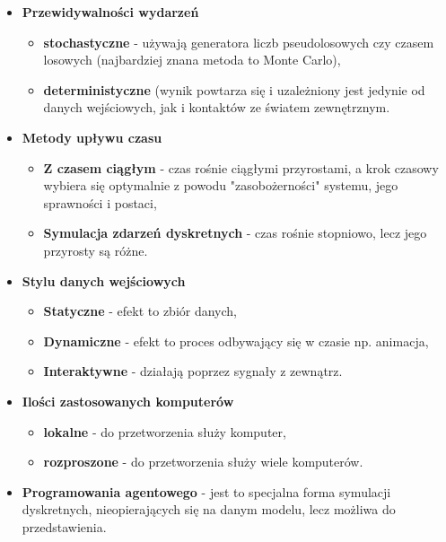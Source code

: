 \begin{itemize}
	\item \textbf{Przewidywalności wydarzeń}
	\begin{itemize}
		\item \textbf{stochastyczne} - używają generatora liczb pseudolosowych czy czasem losowych (najbardziej znana metoda to Monte Carlo),
		\item \textbf{deterministyczne} (wynik powtarza się i uzależniony jest jedynie od danych wejściowych, jak i kontaktów ze światem zewnętrznym.
	\end{itemize}
	\item \textbf{Metody upływu czasu}
	\begin{itemize}
		\item \textbf{Z czasem ciągłym} - czas rośnie ciągłymi przyrostami, a krok czasowy wybiera się optymalnie z powodu "zasobożerności" systemu, jego sprawności i postaci,
		\item \textbf{Symulacja zdarzeń dyskretnych} - czas rośnie stopniowo, lecz jego przyrosty są różne.
	\end{itemize}
	\item \textbf{Stylu danych wejściowych}
	\begin{itemize}
		\item \textbf{Statyczne} - efekt to zbiór danych,
		\item \textbf{Dynamiczne} - efekt to proces odbywający się w czasie np. animacja,
		\item \textbf{Interaktywne} - działają poprzez sygnały z zewnątrz.
	\end{itemize}
	\item \textbf{Ilości zastosowanych komputerów}
	\begin{itemize}
		\item \textbf{lokalne} - do przetworzenia służy komputer,
		\item \textbf{rozproszone} - do przetworzenia służy wiele komputerów.
	\end{itemize}
	\item \textbf{Programowania agentowego} - jest to specjalna forma symulacji dyskretnych, nieopierających się na danym modelu, lecz możliwa do przedstawienia. \\
\end{itemize}

